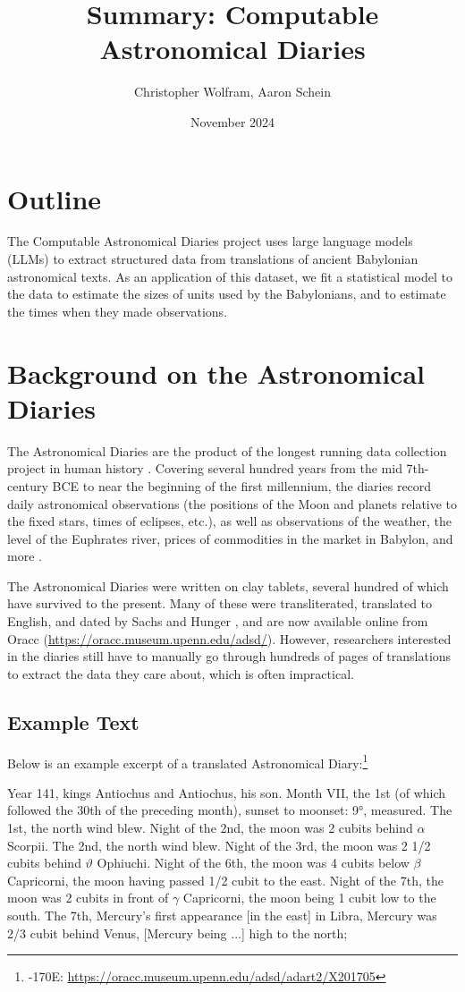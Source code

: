 \documentclass{article}
\title{Summary: Computable Astronomical Diaries}
\author{Christopher Wolfram, Aaron Schein}
\date{November 2024}
\begin{document}
\maketitle

\section{Outline}

The Computable Astronomical Diaries project uses large language models (LLMs) to extract structured data from translations of ancient Babylonian astronomical texts. As an application of this dataset, we fit a statistical model to the data to estimate the sizes of units used by the Babylonians, and to estimate the times when they made observations.

\section{Background on the Astronomical Diaries}
The Astronomical Diaries are the product of the longest running data collection project in human history \autocite{steeleIntro, whoWrote}. Covering several hundred years from the mid 7th-century BCE to near the beginning of the first millennium, the diaries record daily astronomical observations (the positions of the Moon and planets relative to the fixed stars, times of eclipses, etc.), as well as observations of the weather, the level of the Euphrates river, prices of commodities in the market in Babylon, and more \autocite{sachsHunger}.

The Astronomical Diaries were written on clay tablets, several hundred of which have survived to the present. Many of these were transliterated, translated to English, and dated by Sachs and Hunger \autocite{sachsHunger}, and are now available online from Oracc (\url{https://oracc.museum.upenn.edu/adsd/}). However, researchers interested in the diaries still have to manually go through hundreds of pages of translations to extract the data they care about, which is often impractical.

\subsection{Example Text}
Below is an example excerpt of a translated Astronomical Diary:\footnote{-170E: \url{https://oracc.museum.upenn.edu/adsd/adart2/X201705}}

\begin{displayquote}
Year 141, kings Antiochus and Antiochus, his son. Month VII, the 1st (of which followed the 30th of the preceding month), sunset to moonset: 9°, measured. The 1st, the north wind blew. Night of the 2nd, the moon was 2 cubits behind $\alpha$ Scorpii. The 2nd, the north wind blew. Night of the 3rd, the moon was 2 1/2 cubits behind $\vartheta$ Ophiuchi. Night of the 6th, the moon was 4 cubits below $\beta$ Capricorni, the moon having passed 1/2 cubit to the east. Night of the 7th, the moon was 2 cubits in front of $\gamma$ Capricorni, the moon being 1 cubit low to the south. The 7th, Mercury's first appearance [in the east] in Libra, Mercury was 2/3 cubit behind Venus, [Mercury being ...] high to the north;
\end{displayquote}
\end{document}
